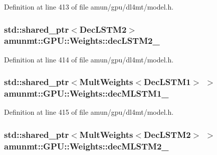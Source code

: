 Definition at line 413 of file amun/gpu/dl4mt/model.\+h.

\subsubsection[{\texorpdfstring{dec\+L\+S\+T\+M2\+\_\+}{decLSTM2_}}]{\setlength{\rightskip}{0pt plus 5cm}std\+::shared\+\_\+ptr$<${\bf Dec\+L\+S\+T\+M2}$>$ amunmt\+::\+G\+P\+U\+::\+Weights\+::dec\+L\+S\+T\+M2\+\_\+}\hypertarget{structamunmt_1_1GPU_1_1Weights_a680cf6d59125ef2b8eeac1fd29679984}{}\label{structamunmt_1_1GPU_1_1Weights_a680cf6d59125ef2b8eeac1fd29679984}


Definition at line 414 of file amun/gpu/dl4mt/model.\+h.

\subsubsection[{\texorpdfstring{dec\+M\+L\+S\+T\+M1\+\_\+}{decMLSTM1_}}]{\setlength{\rightskip}{0pt plus 5cm}std\+::shared\+\_\+ptr$<${\bf Mult\+Weights}$<${\bf Dec\+L\+S\+T\+M1}$>$ $>$ amunmt\+::\+G\+P\+U\+::\+Weights\+::dec\+M\+L\+S\+T\+M1\+\_\+}\hypertarget{structamunmt_1_1GPU_1_1Weights_a267b4f3b1fbc7c224a4a3fa9aa126658}{}\label{structamunmt_1_1GPU_1_1Weights_a267b4f3b1fbc7c224a4a3fa9aa126658}


Definition at line 415 of file amun/gpu/dl4mt/model.\+h.

\subsubsection[{\texorpdfstring{dec\+M\+L\+S\+T\+M2\+\_\+}{decMLSTM2_}}]{\setlength{\rightskip}{0pt plus 5cm}std\+::shared\+\_\+ptr$<${\bf Mult\+Weights}$<${\bf Dec\+L\+S\+T\+M2}$>$ $>$ amunmt\+::\+G\+P\+U\+::\+Weights\+::dec\+M\+L\+S\+T\+M2\+\_\+}\hypertarget{structamunmt_1_1GPU_1_1Weights_ac2efb526e19d690a736aca4f952703f2}{}\label{structamunmt_1_1GPU_1_1Weights_ac2efb526e19d690a736aca4f952703f2}


